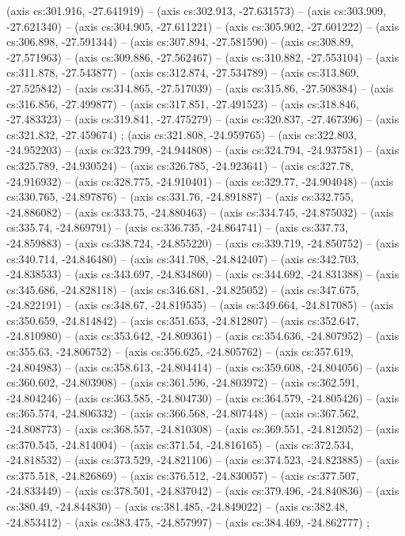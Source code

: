     (axis cs:301.916,    -27.641919) --  (axis cs:302.913,    -27.631573) --  (axis cs:303.909,    -27.621340) --  (axis cs:304.905,    -27.611221) --  (axis cs:305.902,    -27.601222) --  (axis cs:306.898,    -27.591344) --  (axis cs:307.894,    -27.581590) --  (axis cs:308.89,    -27.571963) --  (axis cs:309.886,    -27.562467) --  (axis cs:310.882,    -27.553104) --  (axis cs:311.878,    -27.543877) --  (axis cs:312.874,    -27.534789) --  (axis cs:313.869,    -27.525842) --  (axis cs:314.865,    -27.517039) --  (axis cs:315.86,    -27.508384) --  (axis cs:316.856,    -27.499877) --  (axis cs:317.851,    -27.491523) --  (axis cs:318.846,    -27.483323) --  (axis cs:319.841,    -27.475279) --  (axis cs:320.837,    -27.467396) --  (axis cs:321.832,    -27.459674) ;
    (axis cs:321.808,    -24.959765) --  (axis cs:322.803,    -24.952203) --  (axis cs:323.799,    -24.944808) --  (axis cs:324.794,    -24.937581) --  (axis cs:325.789,    -24.930524) --  (axis cs:326.785,    -24.923641) --  (axis cs:327.78,    -24.916932) --  (axis cs:328.775,    -24.910401) --  (axis cs:329.77,    -24.904048) --  (axis cs:330.765,    -24.897876) --  (axis cs:331.76,    -24.891887) --  (axis cs:332.755,    -24.886082) --  (axis cs:333.75,    -24.880463) --  (axis cs:334.745,    -24.875032) --  (axis cs:335.74,    -24.869791) --  (axis cs:336.735,    -24.864741) --  (axis cs:337.73,    -24.859883) --  (axis cs:338.724,    -24.855220) --  (axis cs:339.719,    -24.850752) --  (axis cs:340.714,    -24.846480) --  (axis cs:341.708,    -24.842407) --  (axis cs:342.703,    -24.838533) --  (axis cs:343.697,    -24.834860) --  (axis cs:344.692,    -24.831388) --  (axis cs:345.686,    -24.828118) --  (axis cs:346.681,    -24.825052) --  (axis cs:347.675,    -24.822191) --  (axis cs:348.67,    -24.819535) --  (axis cs:349.664,    -24.817085) --  (axis cs:350.659,    -24.814842) --  (axis cs:351.653,    -24.812807) --  (axis cs:352.647,    -24.810980) --  (axis cs:353.642,    -24.809361) --  (axis cs:354.636,    -24.807952) --  (axis cs:355.63,    -24.806752) --  (axis cs:356.625,    -24.805762) --  (axis cs:357.619,    -24.804983) --  (axis cs:358.613,    -24.804414) --  (axis cs:359.608,    -24.804056) --  (axis cs:360.602,    -24.803908) --  (axis cs:361.596,    -24.803972) --  (axis cs:362.591,    -24.804246) --  (axis cs:363.585,    -24.804730) --  (axis cs:364.579,    -24.805426) --  (axis cs:365.574,    -24.806332) --  (axis cs:366.568,    -24.807448) --  (axis cs:367.562,    -24.808773) --  (axis cs:368.557,    -24.810308) --  (axis cs:369.551,    -24.812052) --  (axis cs:370.545,    -24.814004) --  (axis cs:371.54,    -24.816165) --  (axis cs:372.534,    -24.818532) --  (axis cs:373.529,    -24.821106) --  (axis cs:374.523,    -24.823885) --  (axis cs:375.518,    -24.826869) --  (axis cs:376.512,    -24.830057) --  (axis cs:377.507,    -24.833449) --  (axis cs:378.501,    -24.837042) --  (axis cs:379.496,    -24.840836) --  (axis cs:380.49,    -24.844830) --  (axis cs:381.485,    -24.849022) --  (axis cs:382.48,    -24.853412) --  (axis cs:383.475,    -24.857997) --  (axis cs:384.469,    -24.862777) ;
